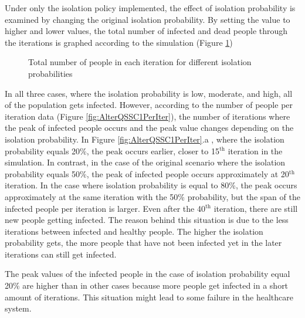 \documentclass{article}
\begin{document}
\; \; Under only the isolation policy implemented, the effect of isolation probability is examined by changing the original isolation probability. By setting the value to higher and lower values, the total number of infected and dead people through the iterations is graphed according to the simulation (Figure \ref{fig:AlterQSSC1})
\begin{figure}[h]
    \centering
    \qquad
    \qquad
    \caption{Total number of people in each iteration for different isolation probabilities}
    \label{fig:AlterQSSC1}%
\end{figure}

In all three cases, where the isolation probability is low, moderate, and high, all of the population gets infected. However, according to the number of people per iteration data (Figure \ref{fig:AlterQSSC1PerIter}), the number of iterations where the peak of infected people occurs and the peak value changes depending on the isolation probability. In Figure \ref{fig:AlterQSSC1PerIter}.a , where the isolation probability equals 20\%, the peak occurs earlier, closer to 15$^{\textrm{th}}$ iteration in the simulation. In contrast, in the case of the original scenario where the isolation probability equals 50\%, the peak of infected people occurs approximately at 20$^{\textrm{th}}$ iteration. In the case where isolation probability is equal to 80\%, the peak occurs approximately at the same iteration with the 50\% probability, but the span of the infected people per iteration is larger. Even after the 40$^{\textrm{th}}$ iteration, there are still new people getting infected. The reason behind this situation is due to the less iterations between infected and healthy people. The higher the isolation probability gets, the more people that have not been infected yet in the later iterations can still get infected. 

The peak values of the infected people in the case of isolation probability equal 20\% are higher than in other cases because more people get infected in a short amount of iterations. This situation might lead to some failure in the healthcare system.
\end{document}
